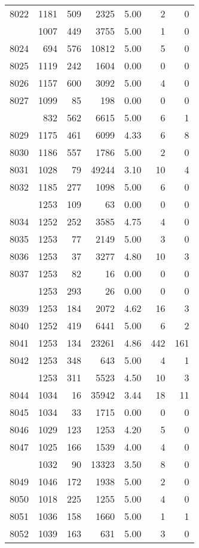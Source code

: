 \documentclass[
]{article}
\begin{document}
\begin{table}
\begin{tabular}[t]{lrrrrrr}
8022 & 1181 & 509 & 2325 & 5.00 & 2 & 0\\
\addlinespace
8023 & 1007 & 449 & 3755 & 5.00 & 1 & 0\\
8024 & 694 & 576 & 10812 & 5.00 & 5 & 0\\
8025 & 1119 & 242 & 1604 & 0.00 & 0 & 0\\
8026 & 1157 & 600 & 3092 & 5.00 & 4 & 0\\
8027 & 1099 & 85 & 198 & 0.00 & 0 & 0\\
\addlinespace
8028 & 832 & 562 & 6615 & 5.00 & 6 & 1\\
8029 & 1175 & 461 & 6099 & 4.33 & 6 & 8\\
8030 & 1186 & 557 & 1786 & 5.00 & 2 & 0\\
8031 & 1028 & 79 & 49244 & 3.10 & 10 & 4\\
8032 & 1185 & 277 & 1098 & 5.00 & 6 & 0\\
\addlinespace
8033 & 1253 & 109 & 63 & 0.00 & 0 & 0\\
8034 & 1252 & 252 & 3585 & 4.75 & 4 & 0\\
8035 & 1253 & 77 & 2149 & 5.00 & 3 & 0\\
8036 & 1253 & 37 & 3277 & 4.80 & 10 & 3\\
8037 & 1253 & 82 & 16 & 0.00 & 0 & 0\\
\addlinespace
8038 & 1253 & 293 & 26 & 0.00 & 0 & 0\\
8039 & 1253 & 184 & 2072 & 4.62 & 16 & 3\\
8040 & 1252 & 419 & 6441 & 5.00 & 6 & 2\\
8041 & 1253 & 134 & 23261 & 4.86 & 442 & 161\\
8042 & 1253 & 348 & 643 & 5.00 & 4 & 1\\
\addlinespace
8043 & 1253 & 311 & 5523 & 4.50 & 10 & 3\\
8044 & 1034 & 16 & 35942 & 3.44 & 18 & 11\\
8045 & 1034 & 33 & 1715 & 0.00 & 0 & 0\\
8046 & 1029 & 123 & 1253 & 4.20 & 5 & 0\\
8047 & 1025 & 166 & 1539 & 4.00 & 4 & 0\\
\addlinespace
8048 & 1032 & 90 & 13323 & 3.50 & 8 & 0\\
8049 & 1046 & 172 & 1938 & 5.00 & 2 & 0\\
8050 & 1018 & 225 & 1255 & 5.00 & 4 & 0\\
8051 & 1036 & 158 & 1660 & 5.00 & 1 & 1\\
8052 & 1039 & 163 & 631 & 5.00 & 3 & 0\\

\end{tabular}
\end{table}
\end{document}
